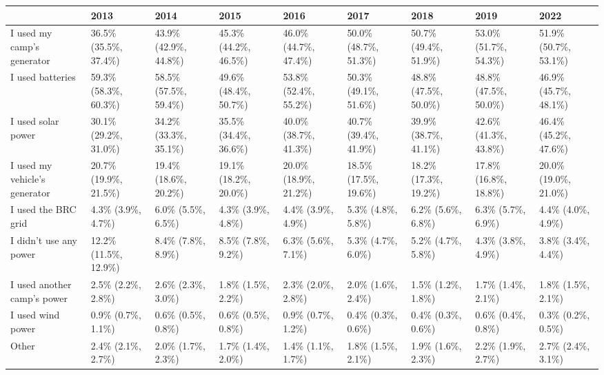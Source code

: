 \documentclass[
]{book}
\begin{document}
\begin{table}
\centering
\begin{tabular}[t]{>{}l|>{}l|>{}l|>{}l|>{}l|>{}l|>{}l|>{}l|>{}l}
\hline
  & 2013 & 2014 & 2015 & 2016 & 2017 & 2018 & 2019 & 2022\\
\hline
I used my camp's generator & 36.5\% (35.5\%, 37.4\%) & 43.9\% (42.9\%, 44.8\%) & 45.3\% (44.2\%, 46.5\%) & 46.0\% (44.7\%, 47.4\%) & 50.0\% (48.7\%, 51.3\%) & 50.7\% (49.4\%, 51.9\%) & 53.0\% (51.7\%, 54.3\%) & 51.9\% (50.7\%, 53.1\%)\\
\hline
I used batteries & 59.3\% (58.3\%, 60.3\%) & 58.5\% (57.5\%, 59.4\%) & 49.6\% (48.4\%, 50.7\%) & 53.8\% (52.4\%, 55.2\%) & 50.3\% (49.1\%, 51.6\%) & 48.8\% (47.5\%, 50.0\%) & 48.8\% (47.5\%, 50.0\%) & 46.9\% (45.7\%, 48.1\%)\\
\hline
I used solar power & 30.1\% (29.2\%, 31.0\%) & 34.2\% (33.3\%, 35.1\%) & 35.5\% (34.4\%, 36.6\%) & 40.0\% (38.7\%, 41.3\%) & 40.7\% (39.4\%, 41.9\%) & 39.9\% (38.7\%, 41.1\%) & 42.6\% (41.3\%, 43.8\%) & 46.4\% (45.2\%, 47.6\%)\\
\hline
I used my vehicle's generator & 20.7\% (19.9\%, 21.5\%) & 19.4\% (18.6\%, 20.2\%) & 19.1\% (18.2\%, 20.0\%) & 20.0\% (18.9\%, 21.2\%) & 18.5\% (17.5\%, 19.6\%) & 18.2\% (17.3\%, 19.2\%) & 17.8\% (16.8\%, 18.8\%) & 20.0\% (19.0\%, 21.0\%)\\
\hline
I used the BRC grid & 4.3\% (3.9\%, 4.7\%) & 6.0\% (5.5\%, 6.5\%) & 4.3\% (3.9\%, 4.8\%) & 4.4\% (3.9\%, 4.9\%) & 5.3\% (4.8\%, 5.8\%) & 6.2\% (5.6\%, 6.8\%) & 6.3\% (5.7\%, 6.9\%) & 4.4\% (4.0\%, 4.9\%)\\
\hline
I didn't use any power & 12.2\% (11.5\%, 12.9\%) & 8.4\% (7.8\%, 8.9\%) & 8.5\% (7.8\%, 9.2\%) & 6.3\% (5.6\%, 7.1\%) & 5.3\% (4.7\%, 6.0\%) & 5.2\% (4.7\%, 5.8\%) & 4.3\% (3.8\%, 4.9\%) & 3.8\% (3.4\%, 4.4\%)\\
\hline
I used another camp's power & 2.5\% (2.2\%, 2.8\%) & 2.6\% (2.3\%, 3.0\%) & 1.8\% (1.5\%, 2.2\%) & 2.3\% (2.0\%, 2.8\%) & 2.0\% (1.6\%, 2.4\%) & 1.5\% (1.2\%, 1.8\%) & 1.7\% (1.4\%, 2.1\%) & 1.8\% (1.5\%, 2.1\%)\\
\hline
I used wind power & 0.9\% (0.7\%, 1.1\%) & 0.6\% (0.5\%, 0.8\%) & 0.6\% (0.5\%, 0.8\%) & 0.9\% (0.7\%, 1.2\%) & 0.4\% (0.3\%, 0.6\%) & 0.4\% (0.3\%, 0.6\%) & 0.6\% (0.4\%, 0.8\%) & 0.3\% (0.2\%, 0.5\%)\\
\hline
Other & 2.4\% (2.1\%, 2.7\%) & 2.0\% (1.7\%, 2.3\%) & 1.7\% (1.4\%, 2.0\%) & 1.4\% (1.1\%, 1.7\%) & 1.8\% (1.5\%, 2.1\%) & 1.9\% (1.6\%, 2.3\%) & 2.2\% (1.9\%, 2.7\%) & 2.7\% (2.4\%, 3.1\%)\\
\hline
\end{tabular}
\end{table}
\end{document}
